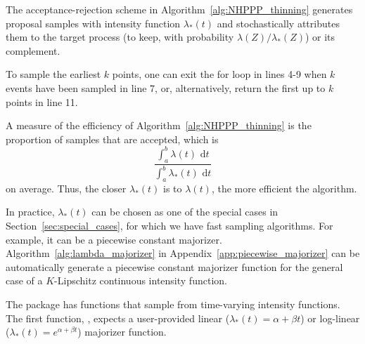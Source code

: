 \documentclass[article]{jss}\usepackage[]{graphicx}\usepackage[]{xcolor}
\newcommand{\fct}[1]{\code{#1()}}
\begin{document}
The acceptance-rejection scheme in Algorithm~\ref{alg:NHPPP_thinning} generates proposal samples with intensity function $\lambda_*(t)$ and stochastically attributes them to the target process (to keep, with probability $\lambda(Z)/\lambda_*(Z)$) or its complement.



To sample the earliest $k$ points, one can exit the for loop in lines 4-9 when $k$ events have been sampled in line 7, or, alternatively, return the first up to $k$ points in line 11.

A measure of the efficiency of Algorithm~\ref{alg:NHPPP_thinning} is the proportion of samples that are accepted, which is
\begin{equation}\label{eq:thinning-efficiency}
\frac{\int_a^b{\lambda(t) \textrm{ d}t}}{\int_a^b{\lambda_*(t) \textrm{ d}t}}
\end{equation}
on average. Thus, the closer $\lambda_*(t)$ is to $\lambda(t)$, the more efficient the algorithm.

In practice, $\lambda_*(t)$ can be chosen as one of the special cases in Section~\ref{sec:special_cases}, for which we have fast sampling algorithms. For example, it can be a piecewise constant majorizer. Algorithm~\ref{alg:lambda_majorizer} in Appendix~\ref{app:piecewise_majorizer} can be automatically generate a piecewise constant majorizer function for the general case of a $K$-Lipschitz continuous intensity function.

The  package has functions that sample from time-varying intensity functions. The first function, \fct{draw\_intensity}, expects a user-provided linear ($\lambda_*(t) = \alpha + \beta t$) or log-linear ($\lambda_*(t) = e^{\alpha + \beta t}$) majorizer function.
\end{document}
